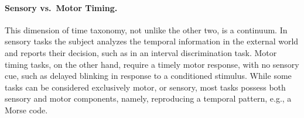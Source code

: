 \paragraph{Sensory vs.\ Motor Timing.} \label{ch:intro:taxonomy:SENvsMOT}
This dimension of time taxonomy, not unlike the other two, is a continuum.
In sensory tasks the subject analyzes the temporal information in the external world and reports their decision, such as in an interval discrimination task.
Motor timing tasks, on the other hand, require a timely motor response, with no sensory cue, such as delayed blinking in response to a conditioned stimulus.
While some tasks can be considered exclusively motor, or sensory, most tasks possess both sensory and motor components, namely, reproducing a temporal pattern, e.g., a Morse code.